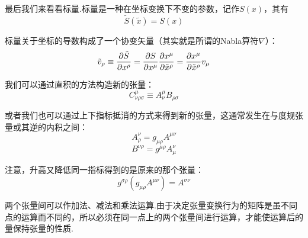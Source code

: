 \documentclass[a4paper]{book}
\begin{document}
\begin{appendix}
最后我们来看看标量.标量是一种在坐标变换下不变的参数，记作$S(x)$，其有
\begin{equation}
	\tilde{S}(\tilde{x})=S(x)
\end{equation}\par 
标量关于坐标的导数构成了一个协变矢量（其实就是所谓的Nabla算符$\nabla$）：
\begin{equation}
	\tilde{v}_{\rho}\equiv \frac{\partial \tilde{S}}{\partial x^{\rho}}=\frac{\partial S}{\partial x^{\mu}}\frac{\partial x^\mu}{\partial \tilde{x}^\rho}=\frac{\partial x^\mu}{\partial \tilde{x}^\rho} v_{\mu} \notag
\end{equation}\par 
我们可以通过直积的方法构造新的张量：
\begin{equation}
	C^{\mu}_{\nu \rho \sigma}\equiv A^{\mu}_{\nu}B_{\rho \sigma}
\end{equation} \par 
或者我们也可以通过上下指标抵消的方式来得到新的张量，这通常发生在与度规张量或其逆的内积之间：
\begin{equation}
	A^{\nu}_{\rho}=g_{\mu \rho}A^{\mu \nu}
\end{equation}
\begin{equation}
	B^{\nu\rho}=g^{\mu \rho}A^{\nu}_{\mu}
\end{equation}\par 
注意，升高又降低同一指标得到的是原来的那个张量：
\begin{equation}
	g^{\sigma \rho}(g_{\mu \rho}A^{\mu \nu})=A^{\sigma \nu}
\end{equation} \par 
两个张量间可以作加法、减法和乘法运算.由于决定张量变换行为的矩阵是虽不同点的运算而不同的，所以必须在同一点上的两个张量间进行运算，才能使运算后的量保持张量的性质.
\newpage

\end{appendix}
\end{document}

